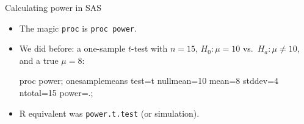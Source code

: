 \documentclass[unknownkeysallowed]{beamer}\usepackage[]{graphicx}\usepackage[]{color}
\begin{document}

\begin{frame}[fragile]{Calculating power in SAS}
  
  \begin{itemize}
  \item The magic \texttt{proc} is \texttt{proc power}. 
  \item We did before: a one-sample $t$-test with $n=15$, $H_0: \mu=10$
    vs.\ $H_a: \mu \ne 10$, and a true $\mu=8$:
    
    \begin{Sascode}[store=pb]
proc power;
  onesamplemeans
  test=t
  nullmean=10
  mean=8
  stddev=4
  ntotal=15
  power=.;
    \end{Sascode}
    
    \item R equivalent was \texttt{power.t.test} (or simulation).
  \end{itemize}
  
\end{frame}
\end{document}
